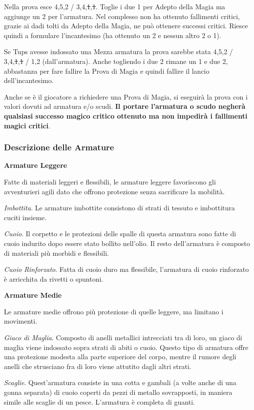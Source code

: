 \begin{multicols}{2}
Nella prova esce 4,5,2 / 3,4,\st{1},\st{1}. Toglie i due 1 per Adepto della Magia ma aggiunge un 2 per l'armatura. Nel complesso non ha ottenuto fallimenti critici, grazie ai dadi tolti da Adepto della Magia, ne può ottenere successi critici. Riesce quindi a formulare l'incantesimo (ha ottenuto un 2 e nessun altro 2 o 1).

Se Tups avesse indossato una Mezza armatura la prova sarebbe stata 4,5,2 / 3,4,\st{1},\st{1} / 1,2 (dall'armatura). Anche togliendo i due 2 rimane un 1 e due 2, abbastanza per fare fallire la Prova di Magia e quindi fallire il lancio dell'incantesimo.

Anche se è il giocatore a richiedere una Prova di Magia, si eseguirà la prova con i valori dovuti ad armatura e/o scudi. \textbf{Il portare l'armatura o scudo negherà qualsiasi successo magico critico ottenuto ma non impedirà i fallimenti magici critici}.

\subsubsection{Descrizione delle Armature}

\textbf{Armature Leggere}

Fatte di materiali leggeri e flessibili, le armature leggere favoriscono gli avventurieri agili dato che offrono protezione senza sacrificare la mobilità.

\emph{Imbottita}. Le armature imbottite consistono di strati di tessuto e imbottitura cuciti insieme.

\emph{Cuoio}. Il corpetto e le protezioni delle spalle di questa armatura sono fatte di cuoio indurito dopo essere stato bollito nell'olio. Il resto dell'armatura è composto di
materiali più morbidi e flessibili.

\emph{Cuoio Rinforzato}. Fatta di cuoio duro ma flessibile, l'armatura di cuoio rinforzato è arricchita da rivetti o spuntoni.

\textbf{Armature Medie}

Le armature medie offrono più protezione di quelle leggere, ma limitano i movimenti.

\emph{Giaco di Maglia}. Composto di anelli metallici intrecciati tra di loro, un giaco di maglia viene indossato sopra strati di abiti o cuoio. Questo tipo di armatura offre una protezione modesta alla parte superiore del corpo, mentre il rumore degli anelli che strusciano fra di loro viene attutito dagli altri strati.

\emph{Scaglie}. Quest'armatura consiste in una cotta e gambali (a volte anche di una gonna separata) di cuoio coperti da pezzi di metallo sovrapposti, in maniera simile alle scaglie di un pesce. L'armatura è completa di guanti.


\end{multicols}
